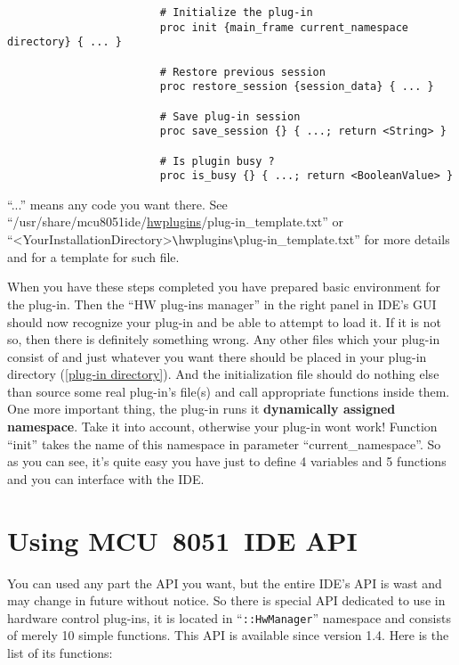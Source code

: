 \documentclass[a4paper,twoside,12pt]{book}
\begin{document}
\begin{enumerate}
{\begin{verbatim}
						# Initialize the plug-in
						proc init {main_frame current_namespace directory} { ... }

						# Restore previous session
						proc restore_session {session_data} { ... }

						# Save plug-in session
						proc save_session {} { ...; return <String> }

						# Is plugin busy ?
						proc is_busy {} { ...; return <BooleanValue> }
					\end{verbatim}
				}

				``...'' means any code you want there. See ``/usr/share/mcu8051ide/\underline{hwplugins}/plug-in\_template.txt'' or ``<YourInstallationDirectory>\verb'\'hwplugins\verb'\'plug-in\_template.txt'' for more details and for a template for such file.
		\end{enumerate}

		When you have these steps completed you have prepared basic environment for the plug-in. Then the ``HW plug-ins manager'' in the right panel in IDE's GUI should now recognize your plug-in and be able to attempt to load it. If it is not so, then there is definitely something wrong. Any other files which your plug-in consist of and just whatever you want there should be placed in your plug-in directory (\ref{plug-in directory}). And the initialization file should do nothing else than source some real plug-in's file(s) and call appropriate functions inside them. One more important thing, the plug-in runs it \textbf{dynamically assigned namespace}. Take it into account, otherwise your plug-in wont work! Function ``init'' takes the name of this namespace in parameter ``current\_namespace''. So as you can see, it's quite easy you have just to define 4 variables and 5 functions and you can interface with the IDE.

	\section{Using MCU~8051~IDE API}
		You can used any part the API you want, but the entire IDE's API is wast and may change in future without notice. So there is special API dedicated to use in hardware control plug-ins, it is located in ``\texttt{::HwManager}'' namespace and consists of merely 10 simple functions. This API is available since version 1.4. Here is the list of its functions:
\end{document}
